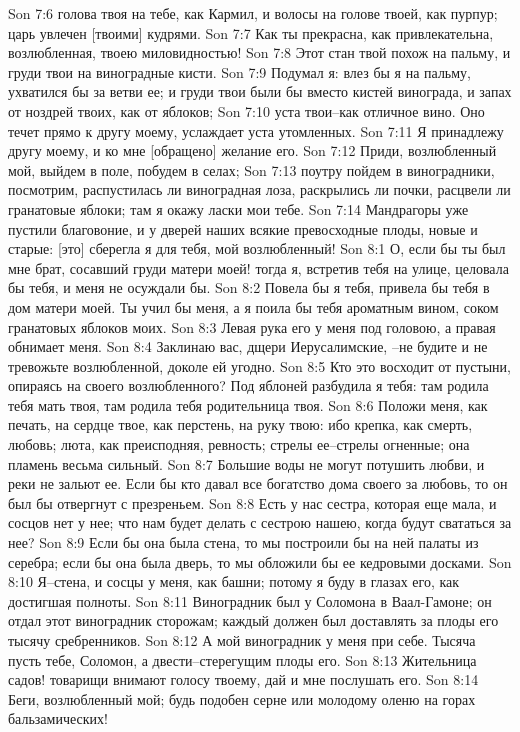 Son 7:6  голова твоя на тебе, как Кармил, и волосы на голове твоей, как пурпур; царь увлечен [твоими] кудрями.
Son 7:7  Как ты прекрасна, как привлекательна, возлюбленная, твоею миловидностью!
Son 7:8  Этот стан твой похож на пальму, и груди твои на виноградные кисти.
Son 7:9  Подумал я: влез бы я на пальму, ухватился бы за ветви ее; и груди твои были бы вместо кистей винограда, и запах от ноздрей твоих, как от яблоков;
Son 7:10  уста твои--как отличное вино. Оно течет прямо к другу моему, услаждает уста утомленных.
Son 7:11  Я принадлежу другу моему, и ко мне [обращено] желание его.
Son 7:12  Приди, возлюбленный мой, выйдем в поле, побудем в селах;
Son 7:13  поутру пойдем в виноградники, посмотрим, распустилась ли виноградная лоза, раскрылись ли почки, расцвели ли гранатовые яблоки; там я окажу ласки мои тебе.
Son 7:14  Мандрагоры уже пустили благовоние, и у дверей наших всякие превосходные плоды, новые и старые: [это] сберегла я для тебя, мой возлюбленный!
Son 8:1  О, если бы ты был мне брат, сосавший груди матери моей! тогда я, встретив тебя на улице, целовала бы тебя, и меня не осуждали бы.
Son 8:2  Повела бы я тебя, привела бы тебя в дом матери моей. Ты учил бы меня, а я поила бы тебя ароматным вином, соком гранатовых яблоков моих.
Son 8:3  Левая рука его у меня под головою, а правая обнимает меня.
Son 8:4  Заклинаю вас, дщери Иерусалимские, --не будите и не тревожьте возлюбленной, доколе ей угодно.
Son 8:5  Кто это восходит от пустыни, опираясь на своего возлюбленного? Под яблоней разбудила я тебя: там родила тебя мать твоя, там родила тебя родительница твоя.
Son 8:6  Положи меня, как печать, на сердце твое, как перстень, на руку твою: ибо крепка, как смерть, любовь; люта, как преисподняя, ревность; стрелы ее--стрелы огненные; она пламень весьма сильный.
Son 8:7  Большие воды не могут потушить любви, и реки не зальют ее. Если бы кто давал все богатство дома своего за любовь, то он был бы отвергнут с презреньем.
Son 8:8  Есть у нас сестра, которая еще мала, и сосцов нет у нее; что нам будет делать с сестрою нашею, когда будут свататься за нее?
Son 8:9  Если бы она была стена, то мы построили бы на ней палаты из серебра; если бы она была дверь, то мы обложили бы ее кедровыми досками.
Son 8:10  Я--стена, и сосцы у меня, как башни; потому я буду в глазах его, как достигшая полноты.
Son 8:11  Виноградник был у Соломона в Ваал-Гамоне; он отдал этот виноградник сторожам; каждый должен был доставлять за плоды его тысячу сребренников.
Son 8:12  А мой виноградник у меня при себе. Тысяча пусть тебе, Соломон, а двести--стерегущим плоды его.
Son 8:13  Жительница садов! товарищи внимают голосу твоему, дай и мне послушать его.
Son 8:14  Беги, возлюбленный мой; будь подобен серне или молодому оленю на горах бальзамических!


